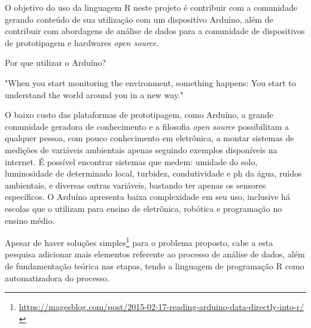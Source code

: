 
O objetivo do uso da linguagem R neste projeto é contribuir com a 
comunidade gerando conteúdo de sua utilização com um dispositívo Arduíno, além de contribuir com 
abordagens de análise de dados para a comunidade de dispositivos de prototipagem e hardwares \emph{open source}.


Por que utilizar o Arduíno? 
\begin{citacao}[english]
  "When you start monitoring the environment,
  something happens: You start to understand the world around you in a new way." \cite{Gertz2012}
\end{citacao}

O baixo custo das plataformas de prototipagem, como Arduíno, a 
grande comunidade geradora de conhecimento e a filosofia \emph{open source}
possibilitam a qualquer pessoa, com pouco conhecimento em eletrônica, a
montar sistemas de medições de variáveis ambientais apenas seguindo exemplos 
disponíveis na internet. É possível encontrar sistemas que medem: umidade do 
solo, luminosidade de determinado local, turbidez, condutividade e ph da água, ruídos 
ambientais, e diversas outras variáveis, bastando ter apenas os sensores 
específicos. O Arduíno apresenta baixa complexidade em seu uso, inclusive há escolas que o utilizam 
para ensino de eletrônica, robótica e programação no ensino médio.
 
Apesar de haver soluções simples\footnote{\url{https://magesblog.com/post/2015-02-17-reading-arduino-data-directly-into-r/}}
para o problema proposto, cabe a esta pesquisa adicionar mais elementos 
referente ao processo de análise de dados, além de fundamentação teórica nas 
etapas, tendo a linguagem de programação R como automatizadora do processo.